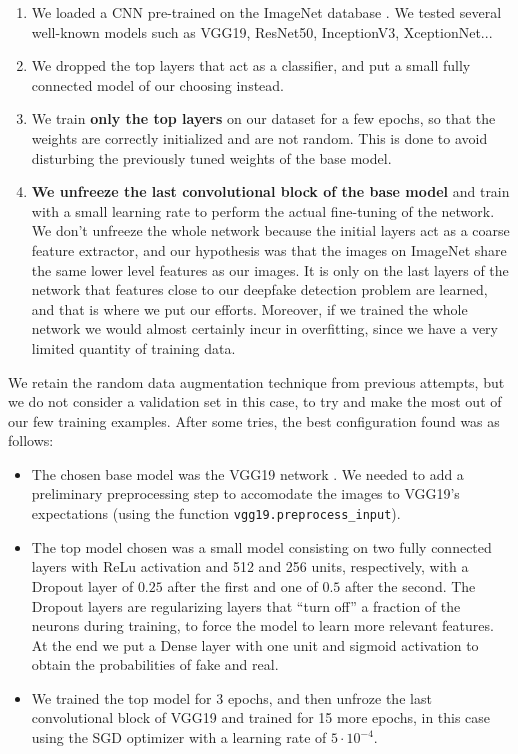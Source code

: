 \documentclass[11pt]{article}
\begin{document}
\begin{enumerate}
  \item We loaded a CNN pre-trained on the ImageNet database \citep{deng2009imagenet}.  We tested several well-known models such as VGG19, ResNet50, InceptionV3, XceptionNet...
  \item We dropped the top layers that act as a classifier, and put a small fully connected model of our choosing instead.
  \item We train \textbf{only the top layers} on our dataset for a few epochs, so that the weights are correctly initialized and are not random. This is done to avoid disturbing the previously tuned weights of the base model.
  \item \textbf{We unfreeze the last convolutional block of the base model} and train with a small learning rate to perform the actual fine-tuning of the network. We don't unfreeze the whole network because the initial layers act as a coarse feature extractor, and our hypothesis was that the images on ImageNet share the same lower level features as our images. It is only on the last layers of the network that features close to our deepfake detection problem are learned, and that is where we put our efforts. Moreover, if we trained the whole network we would almost certainly incur in overfitting, since we have a very limited quantity of training data.
\end{enumerate}

We retain the random data augmentation technique from previous attempts, but we do not consider a validation set in this case, to try and make the most out of our few training examples. After some tries, the best configuration found was as follows:

\begin{itemize}
  \item The chosen base model was the VGG19 network \citep{simonyan2015deep}. We needed to add a preliminary preprocessing step to accomodate the images to VGG19's expectations (using the function \texttt{vgg19.preprocess\_input}).
  \item The top model chosen was a small model consisting on two fully connected layers with ReLu activation and 512 and 256 units, respectively, with a Dropout layer of $0.25$ after the first and one of $0.5$ after the second. The Dropout layers are regularizing layers that ``turn off'' a fraction of the neurons during training, to force the model to learn more relevant features. At the end we put a Dense layer with one unit and sigmoid activation to obtain the probabilities of fake and real.
  \item We trained the top model for 3 epochs, and then unfroze the last convolutional block of VGG19 and trained for 15 more epochs, in this case using the SGD optimizer with a learning rate of $5\cdot 10^{-4}$.
\end{itemize}
\end{document}

